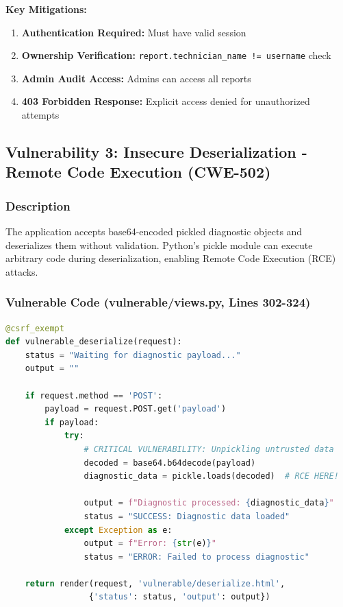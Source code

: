 \documentclass[12pt,a4paper]{article}
\begin{document}
\textbf{Key Mitigations:}
\begin{enumerate}[leftmargin=*]
    \item \textbf{Authentication Required:} Must have valid session
    \item \textbf{Ownership Verification:} \texttt{report.technician\_name != username} check
    \item \textbf{Admin Audit Access:} Admins can access all reports
    \item \textbf{403 Forbidden Response:} Explicit access denied for unauthorized attempts
\end{enumerate}

\newpage

\subsection{Vulnerability 3: Insecure Deserialization - Remote Code Execution (CWE-502)}

\subsubsection{Description}
The application accepts base64-encoded pickled diagnostic objects and deserializes them without validation. Python's pickle module can execute arbitrary code during deserialization, enabling Remote Code Execution (RCE) attacks.

\subsubsection{Vulnerable Code (vulnerable/views.py, Lines 302-324)}

\begin{lstlisting}[language=Python]
@csrf_exempt
def vulnerable_deserialize(request):
    status = "Waiting for diagnostic payload..."
    output = ""

    if request.method == 'POST':
        payload = request.POST.get('payload')
        if payload:
            try:
                # CRITICAL VULNERABILITY: Unpickling untrusted data
                decoded = base64.b64decode(payload)
                diagnostic_data = pickle.loads(decoded)  # RCE HERE!
                
                output = f"Diagnostic processed: {diagnostic_data}"
                status = "SUCCESS: Diagnostic data loaded"
            except Exception as e:
                output = f"Error: {str(e)}"
                status = "ERROR: Failed to process diagnostic"

    return render(request, 'vulnerable/deserialize.html', 
                 {'status': status, 'output': output})
\end{lstlisting}
\end{document}
